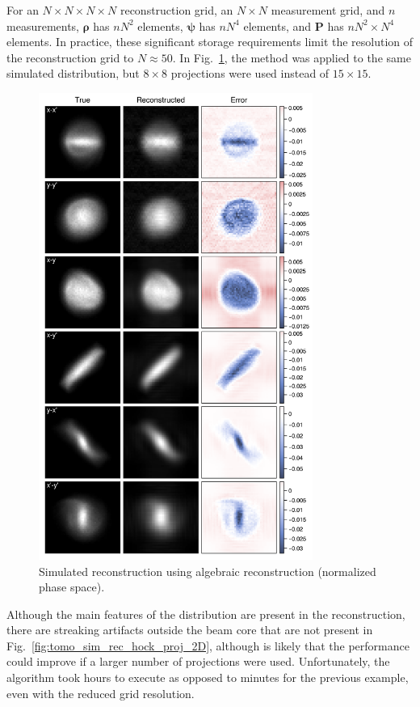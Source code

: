 For an $N \times N \times N \times N$ reconstruction grid, an $N \times N$ measurement grid, and $n$ measurements, $\bm{\rho}$ has $nN^2$ elements, $\bm{\psi}$ has $n N^4$ elements, and $\mathbf{P}$ has $n N^2 \times N^4$ elements. In practice, these significant storage requirements limit the resolution of the reconstruction grid to $N \approx 50$. In Fig.~\ref{fig:tomo_sim_rec_art_proj_2D}, the method was applied to the same simulated distribution, but $8 \times 8$ projections were used instead of $15 \times 15$.
%
\begin{figure}[!p]
    \centering
    \includegraphics[width=0.8\textwidth]{Images/chapter4/tomo_sim_rec_art_proj_2D_ver.png}
    \caption{Simulated reconstruction using algebraic reconstruction (normalized phase space).}
    \label{fig:tomo_sim_rec_art_proj_2D}
\end{figure}
%
Although the main features of the distribution are present in the reconstruction, there are streaking artifacts outside the beam core that are not present in Fig.~\ref{fig:tomo_sim_rec_hock_proj_2D}, although is likely that the performance could improve if a larger number of projections were used. Unfortunately, the algorithm took hours to execute as opposed to minutes for the previous example, even with the reduced grid resolution.


